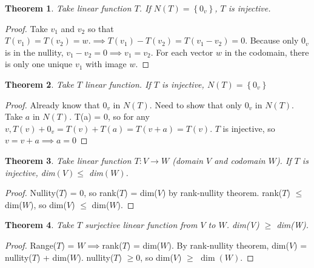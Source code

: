 \documentclass{article}
\newtheorem*{theorem}{Theorem}
\begin{document}
            \begin{theorem}
                Take linear function $T$. If $N(T) = \left\{0_v\right\}$, $T$ is injective. 
            \end{theorem}
            \begin{proof} 
                Take $v_1$ and $v_2$ so that $T(v_1) = T(v_2) = w. \implies T(v_1) - T(v_2) = T(v_1-v_2) = 0$. Because only $0_v$ is in the nullity, $v_1 - v_2 = 0 \implies v_1 = v_2$. For each vector $w$ in the codomain, there is only one unique $v_1$ with image $w$.
            \end{proof}
            \begin{theorem}
                Take $T$ linear function. If $T$ is injective, $N(T) = \left\{0_v\right\}$
            \end{theorem}
            \begin{proof} 
                Already know that $0_v$ in $N(T)$. 
                Need to show that only $0_v$ in $N(T)$. Take $a$ in $N(T)$. T(a) = 0, so for any $v, T(v) + 0_v = T(v) + T(a) = T(v + a) = T(v)$. $T$ is injective, so $v = v+a \implies a = 0$
            \end{proof}
            \begin{theorem}
                Take linear function $T : V \to W$ (domain $V$ and codomain $W$). If $T$ is injective, dim$(V) \leq $ dim$(W)$.
            \end{theorem}
            \begin{proof}
                Nullity($T$) = 0, so rank($T$) = dim($V$) by rank-nullity theorem. rank($T$) $\leq$ dim($W$), so dim($V$) $\leq$ dim($W$).
            \end{proof}
            \begin{theorem}
                Take $T$ surjective linear function from $V$ to $W$. dim(V) $\geq$ dim(W).
            \end{theorem}
            \begin{proof}
                Range($T$) = $W \implies $rank($T$) = dim($W$). By rank-nullity theorem, dim($V$) = nullity($T$) + dim($W$). nullity($T$) $\geq 0$, so dim($V$) $\geq$ $\dim(W)$.
            \end{proof}
\end{document}
